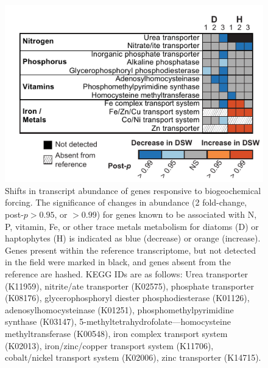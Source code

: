 
\begin{figure}[h!]
  \centering
    \includegraphics[width=.8\textwidth]{Images/C4_Figure3_Final.pdf}
    \caption[Shifts in transcript abundance of genes responsive to biogeochemical forcing]{Shifts in transcript abundance of genes responsive to biogeochemical forcing. The significance of changes in abundance (2 fold-change, post-$p > 0.95$, or $>0.99$) for genes known to be associated with N, P, vitamin, Fe, or other trace metals metabolism for diatoms (D) or haptophytes (H) is indicated as blue (decrease) or orange (increase). Genes present within the reference transcriptome, but not detected in the field were marked in black, and genes absent from the reference are hashed. KEGG IDs are as follows: Urea transporter (K11959), nitrite/ate transporter (K02575), phosphate transporter (K08176), glycerophosphoryl diester phosphodiesterase (K01126), adenosylhomocysteinase (K01251), phosphomethylpyrimidine synthase (K03147), 5-methyltetrahydrofolate—homocysteine methyltransferase (K00548), iron complex transport system (K02013), iron/zinc/copper transport system (K11706), cobalt/nickel transport system (K02006), zinc transporter (K14715).}
  \label{fig:c4f3}
\end{figure}

